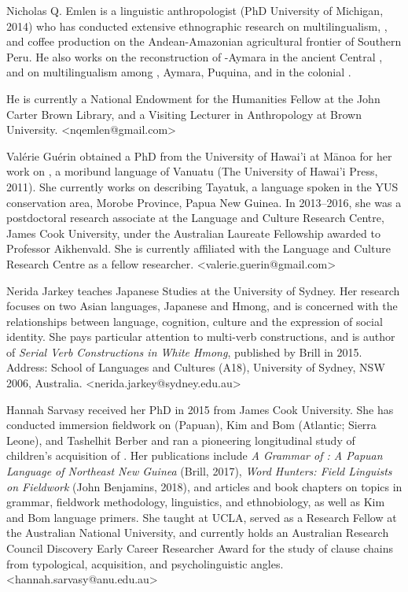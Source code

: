 \begin{refsection}
Nicholas Q. Emlen is a linguistic anthropologist (PhD University of Michigan, 2014) who has conducted extensive ethnographic research on multilingualism, , and coffee production on the Andean-Amazonian agricultural frontier of Southern Peru. He also works on the reconstruction of -Aymara  in the ancient Central , and on multilingualism among , Aymara, Puquina, and  in the colonial . 

\pagebreak
\noindent
He is currently a National Endowment for the Humanities Fellow at the John Carter Brown Library, and a Visiting Lecturer in Anthropology at Brown University. <nqemlen@gmail.com>

Valérie Guérin obtained a PhD from the University of Hawai'i at Mānoa for her work on , a moribund language of Vanuatu (The University of Hawai'i Press, 2011).  She currently works on describing Tayatuk, a language spoken in the YUS conservation area, Morobe Province, Papua New Guinea. In 2013--2016, she was a postdoctoral research associate at the Language and Culture Research Centre, James Cook University, under the Australian Laureate Fellowship awarded to Professor Aikhenvald. She is currently affiliated with the Language and Culture Research Centre as a fellow researcher. <valerie.guerin@gmail.com>

Nerida Jarkey teaches Japanese Studies at the University of Sydney. Her research focuses on two Asian languages, Japanese and Hmong, and is concerned with the relationships between language, cognition, culture and the expression of social identity. She pays particular attention to multi-verb constructions, and is author of \textit{Serial Verb Constructions in White Hmong}, published by Brill in 2015. Address: School of Languages and Cultures (A18), University of Sydney, NSW 2006, Australia. <nerida.jarkey@sydney.edu.au> 

Hannah Sarvasy received her PhD in 2015 from James Cook University. She has conducted immersion fieldwork on  (Papuan), Kim and Bom (Atlantic; Sierra Leone), and Tashelhit Berber and ran a pioneering longitudinal study of children’s acquisition of . Her publications include \textit{A Grammar of : A Papuan Language of Northeast New Guinea} (Brill, 2017), \textit{Word Hunters: Field Linguists on Fieldwork} (John Benjamins, 2018), and articles and book chapters on topics in  grammar, fieldwork methodology,  linguistics, and ethnobiology, as well as Kim and Bom language primers. She taught at UCLA, served as a Research Fellow at the Australian National University, and currently holds an Australian Research Council Discovery Early Career Researcher Award for the study of clause chains from typological, acquisition, and psycholinguistic angles. <hannah.sarvasy@anu.edu.au>


\sloppy


\printbibliography[heading=subbibliography]
\end{refsection}